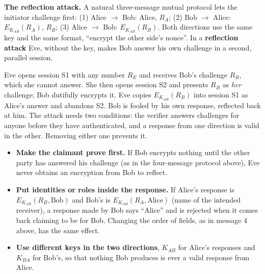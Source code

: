 \textbf{The reflection attack.} A natural three-message mutual protocol lets the initiator challenge first: (1) Alice $\to$ Bob: Alice, $R_A$; (2) Bob $\to$ Alice: $E_{K_{AB}}(R_A)$, $R_B$; (3) Alice $\to$ Bob: $E_{K_{AB}}(R_B)$. Both directions use the same key and the same format, ``encrypt the other side's nonce''. In a \textbf{reflection attack} Eve, without the key, makes Bob answer his own challenge in a second, parallel session.
\begin{center}
\end{center}
Eve opens session S1 with any number $R_E$ and receives Bob's challenge $R_B$, which she cannot answer. She then opens session S2 and presents $R_B$ as \emph{her} challenge; Bob dutifully encrypts it. Eve copies $E_{K_{AB}}(R_B)$ into session S1 as Alice's answer and abandons S2. Bob is fooled by his own response, reflected back at him. The attack needs two conditions: the verifier answers challenges for anyone before they have authenticated, and a response from one direction is valid in the other. Removing either one prevents it.
\begin{itemize}
  \item \textbf{Make the claimant prove first.} If Bob encrypts nothing until the other party has answered his challenge (as in the four-message protocol above), Eve never obtains an encryption from Bob to reflect.
  \item \textbf{Put identities or roles inside the response.} If Alice's response is $E_{K_{AB}}(R_B, \text{Bob})$ and Bob's is $E_{K_{AB}}(R_A, \text{Alice})$ (name of the intended receiver), a response made by Bob says ``Alice'' and is rejected when it comes back claiming to be for Bob. Changing the order of fields, as in message 4 above, has the same effect.
  \item \textbf{Use different keys in the two directions}, $K_{AB}$ for Alice's responses and $K_{BA}$ for Bob's, so that nothing Bob produces is ever a valid response from Alice.
\end{itemize}

